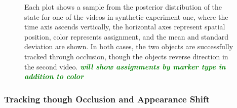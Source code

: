 \documentclass[smallcondensed, final]{svjour3}
\newcommand{\willie}[1]{\textcolor{green}{\textsf{\emph{\textbf{\textcolor{green}{#1}}}}}}
\begin{document}
\begin{figure}
  \centering               
  \caption{Each plot shows a sample from the posterior distribution of the state for one of the videos in synthetic experiment one, where the time axis ascends vertically, the horizontal axes represent spatial position, color represents assignment, and the mean and standard deviation are shown. In both cases, the two objects are successfully tracked through occlusion, though the objects reverse direction in the second video. \willie{will show assignments by marker type in addition to color}}
  \label{fig:synth_one_plot}
\end{figure}




\subsubsection{Tracking though Occlusion and Appearance Shift}
\end{document}
